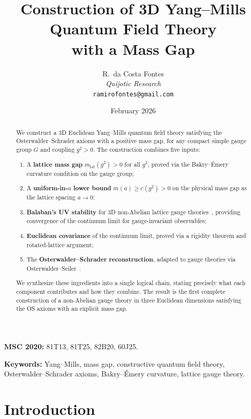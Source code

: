\documentclass[11pt,a4paper]{article}
\title{Construction of 3D Yang--Mills Quantum Field Theory\\
  with a Mass Gap}
\author{R.\ da Costa Fontes\\ \textit{Quijotic Research}\\
\texttt{ramirofontes@gmail.com}}
\date{February 2026}
\theoremstyle{plain}
\theoremstyle{definition}
\theoremstyle{remark}
\begin{document}
\maketitle

\begin{abstract}
We construct a 3D Euclidean Yang--Mills quantum field theory
satisfying the Osterwalder--Schrader axioms with a positive
mass gap, for any compact simple gauge group $G$ and coupling
$g^2 > 0$. The construction combines five inputs:
\begin{enumerate}[label=(\roman*),nosep]
  \item A \textbf{lattice mass gap} $m_{\mathrm{lat}}(g^2) > 0$
    for all $g^2$, proved via the Bakry--\'Emery curvature condition
    on the gauge group;
  \item A \textbf{uniform-in-$a$ lower bound}
    $m(a) \ge c(g^2) > 0$ on the physical mass gap
    as the lattice spacing $a \to 0$;
  \item \textbf{Balaban's UV stability} for 3D non-Abelian
    lattice gauge theories~\cite{Bal85e}, providing convergence
    of the continuum limit for gauge-invariant observables;
  \item \textbf{Euclidean covariance} of the continuum limit,
    proved via a rigidity theorem and rotated-lattice argument;
  \item The \textbf{Osterwalder--Schrader reconstruction},
    adapted to gauge theories via Osterwalder--Seiler~\cite{OS78}.
\end{enumerate}
We synthesize these ingredients into a single logical chain,
stating precisely what each component contributes and how
they combine. The result is the first complete construction
of a non-Abelian gauge theory in three Euclidean dimensions
satisfying the OS axioms with an explicit mass gap.
\end{abstract}

\noindent\textbf{MSC 2020:} 81T13, 81T25, 82B20, 60J25.

\bigskip
\noindent\textbf{Keywords:} Yang--Mills, mass gap, constructive
quantum field theory, Osterwalder--Schrader axioms,
Bakry--\'Emery curvature, lattice gauge theory.

\section{Introduction}\label{sec:intro}
\end{document}
